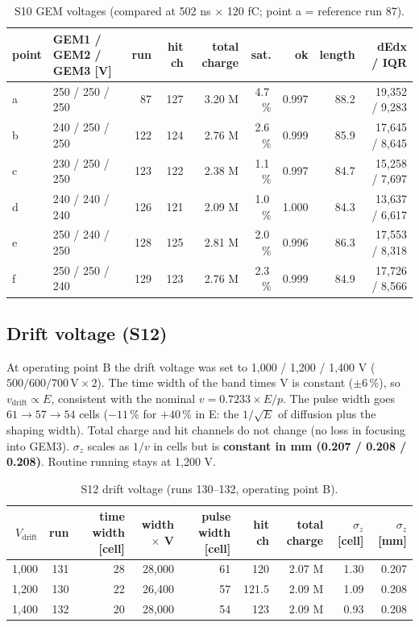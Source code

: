 \documentclass[a4paper,11pt]{article}
\begin{document}
\begin{table}[H]\centering\small
\caption{S10 GEM voltages (compared at 502 ns $\times$ 120 fC; point a = reference run 87).}
\footnotesize
\begin{tabular}{llrrrrrrr}
\toprule
point & GEM1 / GEM2 / GEM3 [V] & run & hit ch & total charge & sat. & ok & length & dEdx / IQR \\
\midrule
a & 250 / 250 / 250 & 87 & 127 & 3.20 M & 4.7\,\% & 0.997 & 88.2 & 19,352 / 9,283 \\
b & 240 / 250 / 250 & 122 & 124 & 2.76 M & 2.6\,\% & 0.999 & 85.9 & 17,645 / 8,645 \\
c & 230 / 250 / 250 & 123 & 122 & 2.38 M & 1.1\,\% & 0.997 & 84.7 & 15,258 / 7,697 \\
d & 240 / 240 / 240 & 126 & 121 & 2.09 M & 1.0\,\% & 1.000 & 84.3 & 13,637 / 6,617 \\
e & 250 / 240 / 250 & 128 & 125 & 2.81 M & 2.0\,\% & 0.996 & 86.3 & 17,553 / 8,318 \\
f & 250 / 250 / 240 & 129 & 123 & 2.76 M & 2.3\,\% & 0.999 & 84.9 & 17,726 / 8,566 \\
\bottomrule
\end{tabular}
\end{table}

\subsection{Drift voltage (S12)}
At operating point B the drift voltage was set to 1,000 / 1,200 / 1,400 V ($500 / 600 / 700\,\mathrm{V} \times 2$). The time width of the band times V is constant ($\pm 6$\,\%), so $v_\mathrm{drift} \propto E$, consistent with the nominal $v = 0.7233 \times E/p$.
The pulse width goes $61 \to 57 \to 54$ cells ($-11$\,\% for $+40$\,\% in E: the $1/\sqrt{E}$ of diffusion plus the shaping width). Total charge and hit channels do not change (no loss in focusing into GEM3).
$\sigma_z$ scales as $1/v$ in cells but is \textbf{constant in mm (0.207 / 0.208 / 0.208)}. Routine running stays at 1,200 V.

\begin{table}[H]\centering\small
\caption{S12 drift voltage (runs 130--132, operating point B).}
\begin{tabular}{rrrrrrrrr}
\toprule
$V_\mathrm{drift}$ & run & time width [cell] & width $\times$ V & pulse width [cell] & hit ch & total charge & $\sigma_z$ [cell] & $\sigma_z$ [mm] \\
\midrule
1,000 & 131 & 28 & 28,000 & 61 & 120 & 2.07 M & 1.30 & 0.207 \\
1,200 & 130 & 22 & 26,400 & 57 & 121.5 & 2.09 M & 1.09 & 0.208 \\
1,400 & 132 & 20 & 28,000 & 54 & 123 & 2.09 M & 0.93 & 0.208 \\
\bottomrule
\end{tabular}
\end{table}
\end{document}
